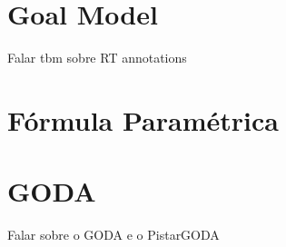 \section{Goal Model}
Falar tbm sobre RT annotations

\section{Fórmula Paramétrica}

\section{GODA}
Falar sobre o GODA e o PistarGODA